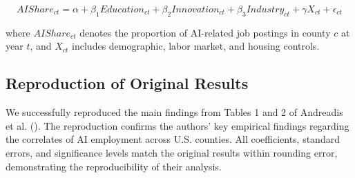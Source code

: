 \documentclass[
]{article}
\begin{document}
\[
AIShare_{ct} = \alpha + \beta_1 Education_{ct} + \beta_2 Innovation_{ct} + \beta_3 Industry_{ct} + \gamma X_{ct} + \epsilon_{ct} \tag{2}
\]

where \(AIShare_{ct}\) denotes the proportion of AI-related job postings
in county \(c\) at year \(t\), and \(X_{ct}\) includes demographic,
labor market, and housing controls.

\subsection{Reproduction of Original
Results}\label{reproduction-of-original-results}

We successfully reproduced the main findings from Tables 1 and 2 of
Andreadis et al. (). The reproduction
confirms the authors' key empirical findings regarding the correlates of
AI employment across U.S. counties. All coefficients, standard errors,
and significance levels match the original results within rounding
error, demonstrating the reproducibility of their analysis.
\end{document}
